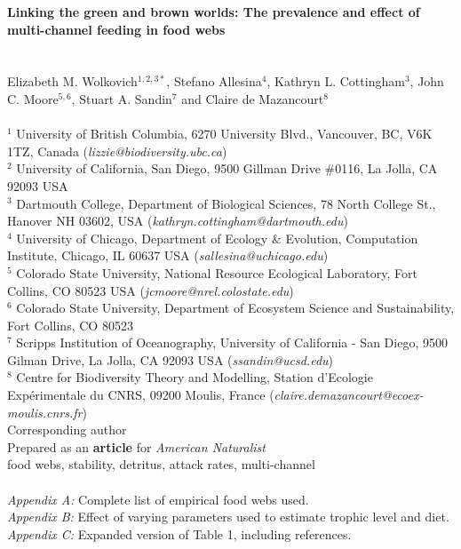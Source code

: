 \documentclass[12pt,a4paper,oneside]{article}
\begin{document}
{ \noindent \bf Linking the green and brown worlds: The prevalence and
 effect of multi-channel feeding in food webs}\\
\\
 \\
\noindent Elizabeth M. Wolkovich\(^{1,2,3*}\), Stefano Allesina\(^{4}\), Kathryn
L. Cottingham\(^{3}\), John C. Moore\(^{5,6}\), Stuart A. Sandin\(^{7}\) and Claire de
Mazancourt\(^{8}\)\\
\\
\noindent \(^{1}\) University of British Columbia, 6270 University Blvd., Vancouver, BC, V6K 1TZ, Canada (\emph{lizzie@biodiversity.ubc.ca})\\
\noindent \(^{2}\) University of California, San Diego, 9500 Gillman
Drive \#0116, La Jolla, CA 92093 USA\\
\noindent \(^{3}\) Dartmouth College, Department of Biological
Sciences, 78 North College St., Hanover NH 03602,
USA (\emph{kathryn.cottingham@dartmouth.edu})\\
\noindent \(^{4}\) University of Chicago, Department of Ecology \&
Evolution, Computation Institute, Chicago, IL 60637 USA (\emph{sallesina@uchicago.edu})\\ 
\noindent \(^{5}\) Colorado State University, National Resource Ecological Laboratory, Fort
Collins, CO 80523 USA \newline
(\emph{jcmoore@nrel.colostate.edu})\\ 
\noindent \(^{6}\) Colorado State University, Department of Ecosystem Science and Sustainability, Fort Collins, CO 80523\\
\noindent \(^{7}\) Scripps Institution of Oceanography, University of
California - San Diego, 9500 Gilman Drive, La Jolla, CA 92093 USA
(\emph{ssandin@ucsd.edu}) \\
\noindent \(^{8}\) Centre for Biodiversity Theory and Modelling, Station d'Ecologie Exp\'{e}rimentale du CNRS, 09200 Moulis, France 
(\emph{claire.demazancourt@ecoex-moulis.cnrs.fr})\\
\noindent * Corresponding author
\\

\noindent Prepared as an {\bf article} for \emph{American
 Naturalist}\\

 food webs, stability, detritus, attack
rates, multi-channel\\

\\
\noindent \emph{Appendix A:} Complete list of empirical food webs used.\\
\noindent \emph{Appendix B:} Effect of varying parameters used to
estimate trophic level and diet. 
\noindent \emph{Appendix C:} Expanded version of Table 1, including references. \\
\end{document}
